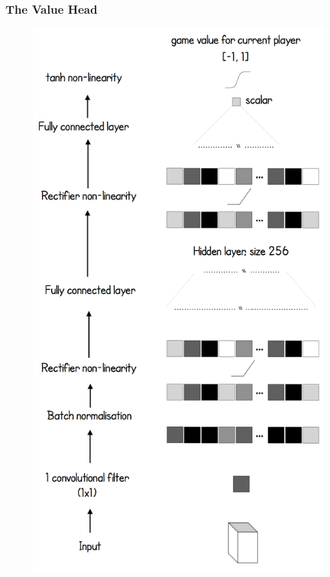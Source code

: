 \documentclass[notheorems, aspectratio=54]{beamer}
\begin{document}
\begin{frame}
    \frametitle{The Value Head}

    \begin{figure}
        \includegraphics[height=0.9\textheight]{fig/the_value_head.png}
    \end{figure}
\end{frame}
\end{document}
